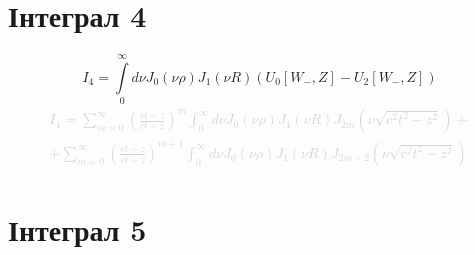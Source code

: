 \section{Інтеграл 4}

\begin{equation}
I_4 = \int \limits_{0}^{\infty} d \nu J_0(\nu \rho) J_1(\nu R) 
(U_0[ W_-, Z ] - U_2[ W_-, Z ])
\end{equation}
%
\textcolor{lightgray}{ \begin{equation*} \begin{aligned}
I_4 =  \sum_{m = 0}^{\infty} \left( \frac{ct-z}{ct+z} \right)^m 
\int_{0}^{\infty} d \nu J_0(\nu \rho) J_1(\nu R) 
J_{2m} \left (\nu \sqrt{c^2t^2-z^2} \right) + \\ + \sum \limits_{m = 0}^{\infty} 
\left( \frac{ct-z}{ct+z} \right)^{m+1} \int_{0}^{\infty}
d \nu J_0(\nu \rho) J_1(\nu R) J_{2m+2} \left (\nu \sqrt{c^2t^2-z^2} \right)
\end{aligned} \end{equation*} }

\section{Інтеграл 5}

